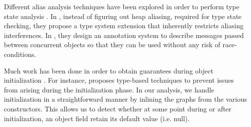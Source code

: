 Different alias analysis techniques have been explored in order to perform type
state analysis \cite{DBLP:journals/tse/StromY86, DBLP:journals/tse/StromY93}.
In \cite{DBLP:conf/pldi/FahndrichD02}, instead of figuring out heap aliasing,
required for type state checking, they propose a type system extension that
inherently restricts aliasing interferences. In
\cite{DBLP:conf/ecoop/HallerO10}, they design an annotation system to describe
messages passed between concurrent objects so that they can be used
without any risk of race-conditions.

Much work has been done in order to obtain guarantees during object
initialization
\cite{DBLP:conf/popl/QiM09,DBLP:conf/oopsla/FahndrichX07,DBLP:conf/ecoop/ChalinJ07}.
For instance, \cite{DBLP:conf/oopsla/FahndrichX07} proposes type-based
techniques to prevent issues from arising during the initialization phase. In
our analysis, we handle initialization in a straightforward manner by inlining
the graphs from the various constructors. This allows us to detect whether at
some point during or after initialization, an object field retain its default
value (i.e.  null).

